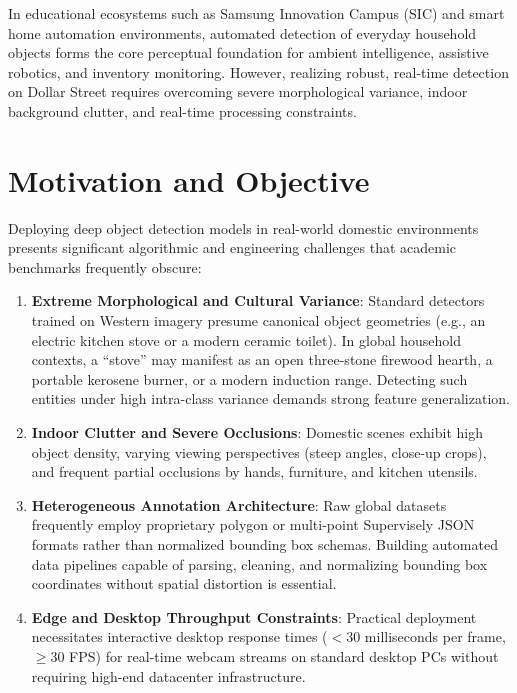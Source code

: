 In educational ecosystems such as Samsung Innovation Campus (SIC) and smart home automation environments, automated detection of everyday household objects forms the core perceptual foundation for ambient intelligence, assistive robotics, and inventory monitoring. However, realizing robust, real-time detection on Dollar Street requires overcoming severe morphological variance, indoor background clutter, and real-time processing constraints.

\section{Motivation and Objective}
\label{sec:motivation_objective}

Deploying deep object detection models in real-world domestic environments presents significant algorithmic and engineering challenges that academic benchmarks frequently obscure:
\begin{enumerate}[label=\alph*)]
    \item \textbf{Extreme Morphological and Cultural Variance}: Standard detectors trained on Western imagery presume canonical object geometries (e.g., an electric kitchen stove or a modern ceramic toilet). In global household contexts, a ``stove'' may manifest as an open three-stone firewood hearth, a portable kerosene burner, or a modern induction range. Detecting such entities under high intra-class variance demands strong feature generalization.
    \item \textbf{Indoor Clutter and Severe Occlusions}: Domestic scenes exhibit high object density, varying viewing perspectives (steep angles, close-up crops), and frequent partial occlusions by hands, furniture, and kitchen utensils.
    \item \textbf{Heterogeneous Annotation Architecture}: Raw global datasets frequently employ proprietary polygon or multi-point Supervisely JSON formats rather than normalized bounding box schemas. Building automated data pipelines capable of parsing, cleaning, and normalizing bounding box coordinates without spatial distortion is essential.
    \item \textbf{Edge and Desktop Throughput Constraints}: Practical deployment necessitates interactive desktop response times ($<30$ milliseconds per frame, $\ge 30$ FPS) for real-time webcam streams on standard desktop PCs without requiring high-end datacenter infrastructure.
\end{enumerate}

